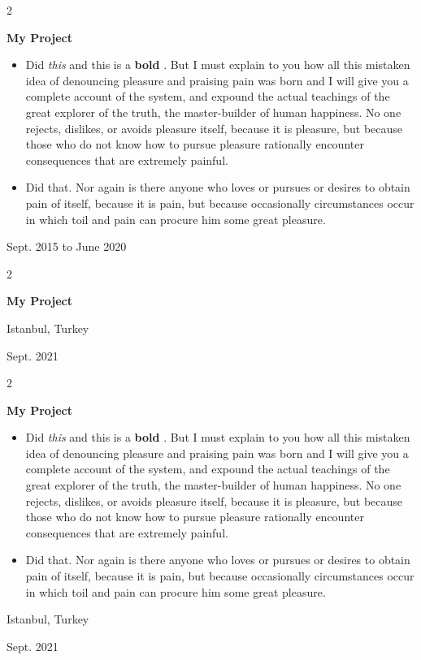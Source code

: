 \documentclass[10pt, letterpaper]{article}
\newenvironment{highlights}{
    \begin{itemize}[
        topsep=0.10 cm,
        parsep=0.10 cm,
        partopsep=0pt,
        itemsep=0pt,
        leftmargin=0.4 cm + 10pt
    ]
}{
    \end{itemize}
} %
\newenvironment{twocolentry}[2][]{
    \onecolentry
    \def\secondColumn{#2}
    \setcolumnwidth{\fill, 4.5 cm}
    \begin{paracol}{2}
}{
    \switchcolumn \raggedleft \secondColumn
    \end{paracol}
    \endonecolentry
} %
\let\hrefWithoutArrow\href
\renewcommand{\href}[2]{\hrefWithoutArrow{#1}{\mbox{\ifthenelse{\equal{#2}{}}{ }{#2 }\raisebox{.15ex}{\footnotesize \faExternalLink*}}}}
\begin{document}
        \vspace{0.2 cm}

        \begin{twocolentry}{
            Sept. 2015 to June 2020
        }
            \textbf{My Project}
            \begin{highlights}
                \item Did \textit{this} and this is a \textbf{bold} \href{https://example.com}{link}. But I must explain to you how all this mistaken idea of denouncing pleasure and praising pain was born and I will give you a complete account of the system, and expound the actual teachings of the great explorer of the truth, the master-builder of human happiness. No one rejects, dislikes, or avoids pleasure itself, because it is pleasure, but because those who do not know how to pursue pleasure rationally encounter consequences that are extremely painful.
                \item Did that. Nor again is there anyone who loves or pursues or desires to obtain pain of itself, because it is pain, but because occasionally circumstances occur in which toil and pain can procure him some great pleasure.
            \end{highlights}
        \end{twocolentry}


        \vspace{0.2 cm}

        \begin{twocolentry}{
            Istanbul, Turkey

        Sept. 2021
        }
            \textbf{My Project}
        \end{twocolentry}


        \vspace{0.2 cm}

        \begin{twocolentry}{
            Istanbul, Turkey

        Sept. 2021
        }
            \textbf{My Project}
            \begin{highlights}
                \item Did \textit{this} and this is a \textbf{bold} \href{https://example.com}{link}. But I must explain to you how all this mistaken idea of denouncing pleasure and praising pain was born and I will give you a complete account of the system, and expound the actual teachings of the great explorer of the truth, the master-builder of human happiness. No one rejects, dislikes, or avoids pleasure itself, because it is pleasure, but because those who do not know how to pursue pleasure rationally encounter consequences that are extremely painful.
                \item Did that. Nor again is there anyone who loves or pursues or desires to obtain pain of itself, because it is pain, but because occasionally circumstances occur in which toil and pain can procure him some great pleasure.
            \end{highlights}
        \end{twocolentry}
\end{document}
